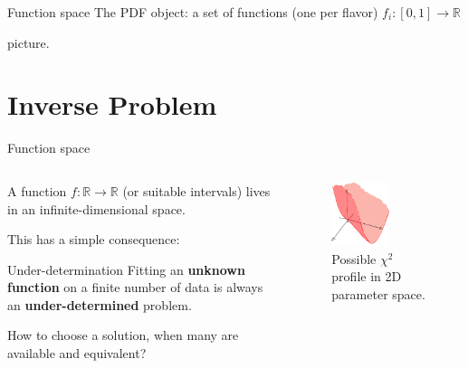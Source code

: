 \documentclass[9pt]{beamer}
\begin{document}
\begin{frame}{Function space}
    The PDF object: a set of functions (one per flavor) $f_i: [0, 1] \to \mathbb{R}$

     picture.
\end{frame}

\section{Inverse Problem}

\begin{frame}{Function space}
    \begin{columns}
        \begin{column}{0.5\textwidth}
            A function $f: \mathbb{R} \to \mathbb{R}$ (or suitable intervals)
            lives in an infinite-dimensional space.
            \vspace*{20pt}

            This has a simple consequence:
            \begin{block}{Under-determination}
                Fitting an \textbf{unknown function} on a finite number of data
                is always an \textbf{under-determined} problem.
            \end{block}
            \vspace*{20pt}

            How to choose a solution, when \alert{many} are available and
            \alert{equivalent}?
        \end{column}
        \begin{column}{0.5\textwidth}
            \begin{figure}
                \centering
                \includegraphics[width=0.6\textwidth]{underdetermined}
                \caption{Possible $\chi^2$ profile in 2D parameter space.}
            \end{figure}
        \end{column}
    \end{columns}
\end{frame}
\end{document}

